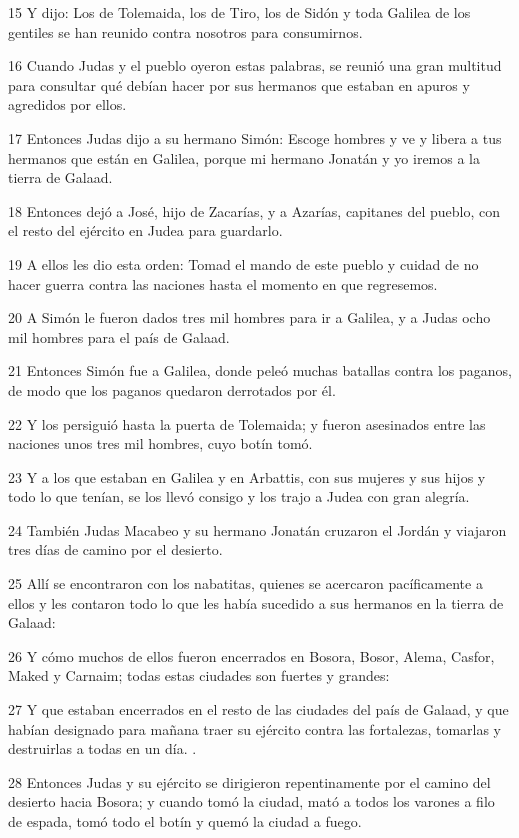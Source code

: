 \par 15 Y dijo: Los de Tolemaida, los de Tiro, los de Sidón y toda Galilea de los gentiles se han reunido contra nosotros para consumirnos.
\par 16 Cuando Judas y el pueblo oyeron estas palabras, se reunió una gran multitud para consultar qué debían hacer por sus hermanos que estaban en apuros y agredidos por ellos.
\par 17 Entonces Judas dijo a su hermano Simón: Escoge hombres y ve y libera a tus hermanos que están en Galilea, porque mi hermano Jonatán y yo iremos a la tierra de Galaad.
\par 18 Entonces dejó a José, hijo de Zacarías, y a Azarías, capitanes del pueblo, con el resto del ejército en Judea para guardarlo.
\par 19 A ellos les dio esta orden: Tomad el mando de este pueblo y cuidad de no hacer guerra contra las naciones hasta el momento en que regresemos.
\par 20 A Simón le fueron dados tres mil hombres para ir a Galilea, y a Judas ocho mil hombres para el país de Galaad.
\par 21 Entonces Simón fue a Galilea, donde peleó muchas batallas contra los paganos, de modo que los paganos quedaron derrotados por él.
\par 22 Y los persiguió hasta la puerta de Tolemaida; y fueron asesinados entre las naciones unos tres mil hombres, cuyo botín tomó.
\par 23 Y a los que estaban en Galilea y en Arbattis, con sus mujeres y sus hijos y todo lo que tenían, se los llevó consigo y los trajo a Judea con gran alegría.
\par 24 También Judas Macabeo y su hermano Jonatán cruzaron el Jordán y viajaron tres días de camino por el desierto.
\par 25 Allí se encontraron con los nabatitas, quienes se acercaron pacíficamente a ellos y les contaron todo lo que les había sucedido a sus hermanos en la tierra de Galaad:
\par 26 Y cómo muchos de ellos fueron encerrados en Bosora, Bosor, Alema, Casfor, Maked y Carnaim; todas estas ciudades son fuertes y grandes:
\par 27 Y que estaban encerrados en el resto de las ciudades del país de Galaad, y que habían designado para mañana traer su ejército contra las fortalezas, tomarlas y destruirlas a todas en un día. .
\par 28 Entonces Judas y su ejército se dirigieron repentinamente por el camino del desierto hacia Bosora; y cuando tomó la ciudad, mató a todos los varones a filo de espada, tomó todo el botín y quemó la ciudad a fuego.
